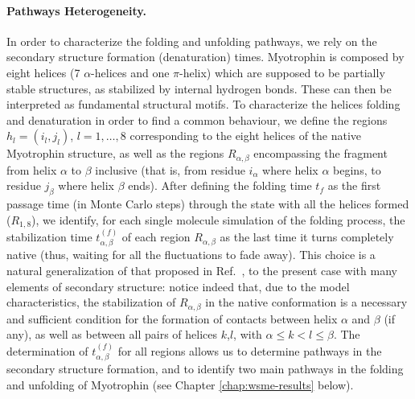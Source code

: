 \paragraph{Pathways Heterogeneity.}
In order to characterize the folding and unfolding pathways, we rely on the
secondary structure formation (denaturation) times. Myotrophin is composed by
eight helices (7 $\alpha$-helices and one $\pi$-helix) which are supposed to be
partially stable structures, as stabilized by internal hydrogen bonds.
These can then be interpreted as fundamental structural motifs.
To characterize the helices folding and denaturation in order to find a common
behaviour, we define the regions $h_l=(i_l,j_l)$, $l=1,\dots,8$
corresponding to the eight helices of the native Myotrophin structure, 
as well as the regions
$R_{\alpha,\beta}$ encompassing the fragment from helix $\alpha$ to $\beta$
inclusive (that is, from residue $i_{\alpha}$ where helix $\alpha$ begins, to
residue $j_{\beta}$ where helix $\beta$ ends).
After defining the folding time $t_f$ as the first passage time (in Monte Carlo
steps) through the
state with all the helices formed ($R_{1,8}$), we identify, for each single
molecule simulation of the folding process, the stabilization time
$t_{\alpha,\beta}^{(f)}$ of each region $R_{\alpha,\beta}$ as the last time it
turns completely native (thus, waiting for all the fluctuations to fade away).
This choice is a natural generalization of that proposed in
Ref.~\cite{Zamparo2009}, to the present case with many elements of secondary
structure: notice indeed  that, due to the model characteristics, the
stabilization of $R_{\alpha,\beta}$ in the native conformation is a necessary
and sufficient condition for the formation of contacts between helix $\alpha$
and $\beta$ (if any), as well as between all pairs of helices $k$,$l$, with
$\alpha \le k < l \le \beta$. The determination of $t_{\alpha,\beta}^{(f)}$ for
all regions allows us to determine pathways in the secondary structure
formation, and to identify two main pathways in the folding and unfolding of
Myotrophin (see Chapter \ref{chap:wsme-results} below).


